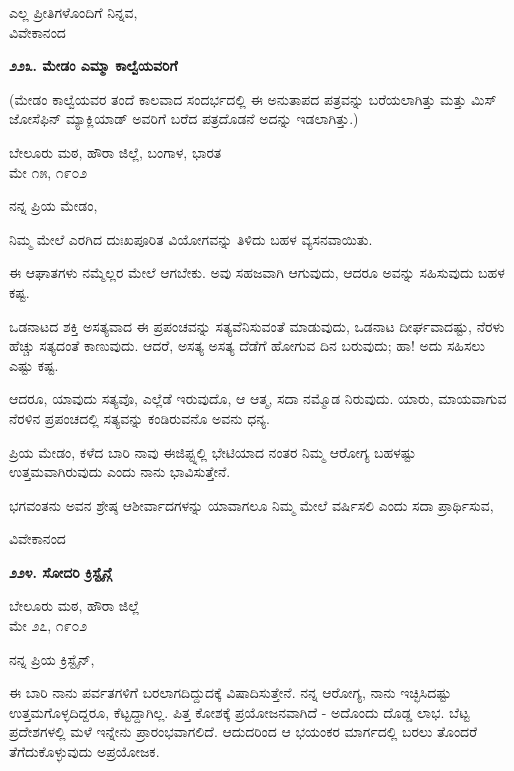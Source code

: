\begin{flushright}
ಎಲ್ಲ ಪ್ರೀತಿಗಳೊಂದಿಗೆ ನಿನ್ನವ,\\ವಿವೇಕಾನಂದ
\end{flushright}

\begin{center}
\textbf{೨೨೩. ಮೇಡಂ ಎಮ್ಮಾ ಕಾಲ್ವೆಯವರಿಗೆ}
\end{center}

(ಮೇಡಂ ಕಾಲ್ವೆಯವರ ತಂದೆ ಕಾಲವಾದ ಸಂದರ್ಭದಲ್ಲಿ ಈ ಅನುತಾಪದ ಪತ್ರವನ್ನು ಬರೆಯಲಾಗಿತ್ತು ಮತ್ತು ಮಿಸ್ ಜೋಸೆಫಿನ್ ಮ್ಯಾಕ್ಲಿಯಾಡ್ ಅವರಿಗೆ ಬರೆದ ಪತ್ರದೊಡನೆ ಅದನ್ನು ಇಡಲಾಗಿತ್ತು.)

\begin{flushright}
ಬೇಲೂರು ಮಠ, ಹೌರಾ ಜಿಲ್ಲೆ, ಬಂಗಾಳ, ಭಾರತ\\ಮೇ ೧೫, ೧೯೦೨
\end{flushright}

ನನ್ನ ಪ್ರಿಯ ಮೇಡಂ,

ನಿಮ್ಮ ಮೇಲೆ ಎರಗಿದ ದುಃಖಪೂರಿತ ವಿಯೋಗವನ್ನು ತಿಳಿದು ಬಹಳ ವ್ಯಸನವಾಯಿತು.

ಈ ಆಘಾತಗಳು ನಮ್ಮೆಲ್ಲರ ಮೇಲೆ ಆಗಬೇಕು. ಅವು ಸಹಜವಾಗಿ ಆಗುವುದು, ಆದರೂ ಅವನ್ನು ಸಹಿಸುವುದು ಬಹಳ ಕಷ್ಟ.

ಒಡನಾಟದ ಶಕ್ತಿ ಅಸತ್ಯವಾದ ಈ ಪ್ರಪಂಚವನ್ನು ಸತ್ಯವೆನಿಸುವಂತೆ ಮಾಡುವುದು, ಒಡನಾಟ ದೀರ್ಘವಾದಷ್ಟು, ನೆರಳು ಹೆಚ್ಚು ಸತ್ಯದಂತೆ ಕಾಣುವುದು. ಆದರೆ, ಅಸತ್ಯ ಅಸತ್ಯ ದೆಡೆಗೆ ಹೋಗುವ ದಿನ ಬರುವುದು; ಹಾ! ಅದು ಸಹಿಸಲು ಎಷ್ಟು ಕಷ್ಟ.

ಆದರೂ, ಯಾವುದು ಸತ್ಯವೊ, ಎಲ್ಲೆಡೆ ಇರುವುದೊ, ಆ ಆತ್ಮ, ಸದಾ ನಮ್ಮೊಡ ನಿರುವುದು. ಯಾರು, ಮಾಯವಾಗುವ ನೆರಳಿನ ಪ್ರಪಂಚದಲ್ಲಿ ಸತ್ಯವನ್ನು ಕಂಡಿರುವನೊ ಅವನು ಧನ್ಯ.

ಪ್ರಿಯ ಮೇಡಂ, ಕಳೆದ ಬಾರಿ ನಾವು ಈಜಿಪ್ಟ್ನಲ್ಲಿ ಭೇಟಿಯಾದ ನಂತರ ನಿಮ್ಮ ಆರೋಗ್ಯ ಬಹಳಷ್ಟು ಉತ್ತಮವಾಗಿರುವುದು ಎಂದು ನಾನು ಭಾವಿಸುತ್ತೇನೆ.

ಭಗವಂತನು ಅವನ ಶ್ರೇಷ್ಠ ಆಶೀರ್ವಾದಗಳನ್ನು ಯಾವಾಗಲೂ ನಿಮ್ಮ ಮೇಲೆ ವರ್ಷಿಸಲಿ ಎಂದು ಸದಾ ಪ್ರಾರ್ಥಿಸುವ,

\begin{flushright}
ವಿವೇಕಾನಂದ
\end{flushright}

\begin{center}
\textbf{೨೨೪. ಸೋದರಿ ಕ್ರಿಸ್ಟೈನ್ಗೆ}
\end{center}

\begin{flushright}
ಬೇಲೂರು ಮಠ, ಹೌರಾ ಜಿಲ್ಲೆ\\ಮೇ ೨೭, ೧೯೦೨
\end{flushright}

ನನ್ನ ಪ್ರಿಯ ಕ್ರಿಸ್ಟೈನ್,

ಈ ಬಾರಿ ನಾನು ಪರ್ವತಗಳಿಗೆ ಬರಲಾಗದಿದ್ದುದಕ್ಕೆ ವಿಷಾದಿಸುತ್ತೇನೆ. ನನ್ನ ಆರೋಗ್ಯ, ನಾನು ಇಚ್ಛಿಸಿದಷ್ಟು ಉತ್ತಮಗೊಳ್ಳದಿದ್ದರೂ, ಕೆಟ್ಟದ್ದಾಗಿಲ್ಲ. ಪಿತ್ತ ಕೋಶಕ್ಕೆ ಪ್ರಯೋಜನವಾಗಿದೆ - ಅದೊಂದು ದೊಡ್ಡ ಲಾಭ. ಬೆಟ್ಟ ಪ್ರದೇಶಗಳಲ್ಲಿ ಮಳೆ ಇನ್ನೇನು ಪ್ರಾರಂಭವಾಗಲಿದೆ. ಆದುದರಿಂದ ಆ ಭಯಂಕರ ಮಾರ್ಗದಲ್ಲಿ ಬರಲು ತೊಂದರೆ ತೆಗೆದುಕೊಳ್ಳುವುದು ಅಪ್ರಯೋಜಕ.

